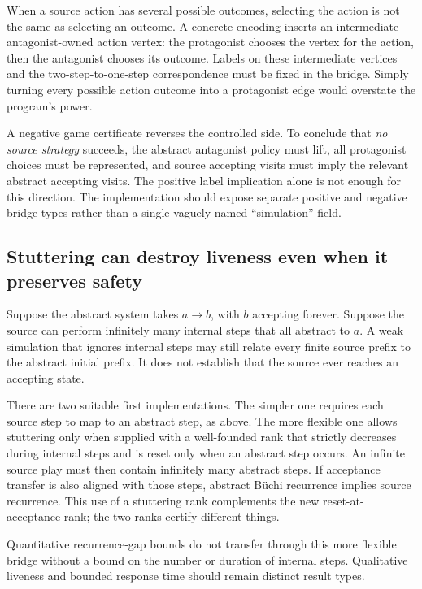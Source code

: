 When a source action has several possible outcomes, selecting the action is
not the same as selecting an outcome. A concrete encoding inserts an
intermediate antagonist-owned action vertex: the protagonist chooses the
vertex for the action, then the antagonist chooses its outcome. Labels on
these intermediate vertices and the two-step-to-one-step correspondence must
be fixed in the bridge. Simply turning every possible action outcome into a
protagonist edge would overstate the program's power.

A negative game certificate reverses the controlled side. To conclude that
\emph{no source strategy} succeeds, the abstract antagonist policy must lift,
all protagonist choices must be represented, and source accepting visits must
imply the relevant abstract accepting visits. The positive label implication
alone is not enough for this direction. The implementation should expose
separate positive and negative bridge types rather than a single vaguely named
``simulation'' field.

\subsection{Stuttering can destroy liveness even when it preserves safety}
Suppose the abstract system takes $a\to b$, with $b$ accepting forever. Suppose
the source can perform infinitely many internal steps that all abstract to
$a$. A weak simulation that ignores internal steps may still relate every
finite source prefix to the abstract initial prefix. It does not establish
that the source ever reaches an accepting state.

There are two suitable first implementations. The simpler one requires each
source step to map to an abstract step, as above. The more flexible one allows
stuttering only when supplied with a well-founded rank that strictly decreases
during internal steps and is reset only when an abstract step occurs. An
infinite source play must then contain infinitely many abstract steps. If
acceptance transfer is also aligned with those steps, abstract B\"uchi
recurrence implies source recurrence. This use of a stuttering rank complements
the new reset-at-acceptance rank; the two ranks certify different things.

Quantitative recurrence-gap bounds do not transfer through this more flexible
bridge without a bound on the number or duration of internal steps. Qualitative
liveness and bounded response time should remain distinct result types.

